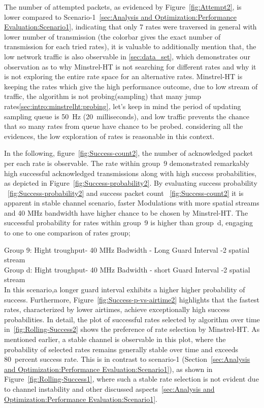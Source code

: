 The number of attempted packets, as evidenced by Figure~\ref{fig:Attempt2}, is lower compared to Scenario-1~\ref{sec:Analysis and Optimization:Performance Evaluation:Scenario1}, indicating that only 7 rates were traversed in general with lower number of transmission (the colorbar gives the exact number of transmission for each tried rates), it is valuable to additionally mention that, the low network traffic is also observable in \ref{sec:data_set}, which demonstrates our observation as to why Minstrel-HT is not searching for different rates and why it is not exploring the entire rate space for an alternative rates. Minstrel-HT is keeping the rates which give the high performance outcome, due to low stream of traffic, the algorithm is not probing(sampling) that many jump rates\ref{sec:intro:minstrelht:probing}, let's keep in mind the period of updating sampling queue is 50~Hz (20~milliseconds), and low traffic prevents the chance that so many rates from queue have chance to be probed. considering all the evidences, the low exploration of rates is reasonable in this context.

In the following, figure~\ref{fig:Success-count2}, the number of acknowledged packet per each rate is observable. The rate within group~9 demonstrated remarkably high successful acknowledged transmissions along with high success probabilities, as depicted in Figure~\ref{fig:Success-probability2}. By evaluating success probability ~\ref{fig:Success-probability2} and success packet count ~\ref{fig:Success-count2} it is apparent in stable channel scenario, faster Modulations with more spatial streams and 40 MHz bandwidth have higher chance to be chosen by Minstrel-HT. The successful probability for rates within group~9 is higher than group~d, engaging to one to one comparison of rates group;

Group 9: Hight troughput- 40 MHz Badwidth - Long Guard Interval -2 spatial stream\\
Group d: Hight troughput- 40 MHz Badwidth - short Guard Interval -2 spatial stream\\
In this scenario,a longer guard interval exhibits a higher higher probability of success. Furthermore, Figure~\ref{fig:Success-p-vs-airtime2} highlights that the fastest rates, characterized by lower airtimes, achieve exceptionally high success probabilities. In detail, the plot of successful rates selected by algorithm over time in~\ref{fig:Rolling-Success2} shows the preference of rate selection by Minstrel-HT. As mentioned earlier, a stable channel is observable in this plot, where the probability of selected rates remains generally stable over time and exceeds 80~percent success rate. This is in contrast to scenario-1 (Section~\ref{sec:Analysis and Optimization:Performance Evaluation:Scenario1}), as shown in Figure~\ref{fig:Rolling-Success1}, where such a stable rate selection is not evident due to channel instability and other discussed aspects~\ref{sec:Analysis and Optimization:Performance Evaluation:Scenario1}.

